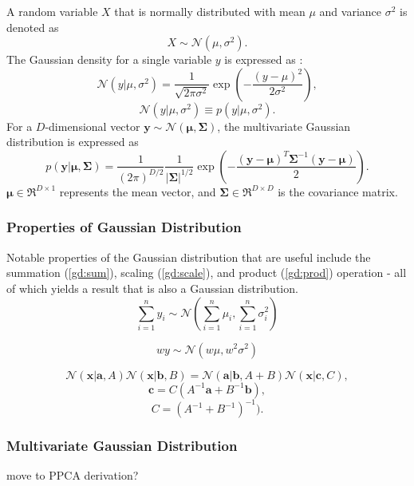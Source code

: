 \documentclass[ %
                    author={Dillon Keith Diep [INCOMPLETE DRAFT, NOT FOR SUBMISSION]},
                supervisor={Dr. Carl Henrik Ek},
                    degree={MEng},
                     title={ARt-CG:},
                  subtitle={Assisted Real-time Content Generation of 3D Hair by Learning Manifolds},
                      type={Research},
                      year={2014} ]{dissertation}
\begin{document}
A random variable $X$ that is normally distributed with mean $\mu$ and variance $\sigma^2$ is denoted as
$$X\sim\mathcal{N}(\mu, \sigma^2).$$
The Gaussian density for a single variable $y$ is expressed as \cite{bishop}:
$$\mathcal{N}(y|\mu, \sigma^2)=\frac{1}{\sqrt{2\pi\sigma^2}}\exp\left(-\frac{(y-\mu)^2}{2\sigma^2}\right),$$
$$\mathcal{N}(y|\mu,\sigma^2) \equiv p(y|\mu,\sigma^2).$$
For a $D$-dimensional vector $\mathbf{y}\sim\mathcal{N}(\pmb{\mu},\pmb{\Sigma})$, the multivariate Gaussian distribution is expressed as \cite{gp}
$$p(\mathbf{y}|\pmb{\mu},\pmb{ \Sigma})=\frac{1}{(2\pi)^{D/2}}\frac{1}{|\pmb{\Sigma}|^{1/2}}\exp\left(-\frac{(\mathbf{y}-\pmb{\mu})^T\pmb{\Sigma}^{-1}(\mathbf{y}-\pmb{\mu})}{2}\right).$$
$\pmb{\mu}\in\Re^{D \times 1}$ represents the mean vector, and $\pmb{\Sigma}\in\Re^{D \times D}$ is the covariance matrix.

\subsubsection{Properties of Gaussian Distribution}
Notable properties of the Gaussian distribution that are useful include the summation (\ref{gd:sum}), scaling (\ref{gd:scale}), and product (\ref{gd:prod}) operation - all of which yields a result that is also a Gaussian distribution. \cite{gp}
\begin{equation} \label{gd:sum}
\sum^n_{i=1}y_i\sim\mathcal{N}(\sum^n_{i=1}\mu_i,\sum^n_{i=1}\sigma^2_i)
\end{equation}

\begin{equation} \label{gd:scale}
wy\sim\mathcal{N}(w\mu,w^2\sigma^2)
\end{equation}

\begin{equation} \label{gd:prod}
\mathcal{N}(\mathbf{x|a},A)\mathcal{N}(\mathbf{x|b},B) = \mathcal{N}(\mathbf{a|b},A+B)\mathcal{N}(\mathbf{x}|\mathbf{c}, C),
\end{equation}
$$\mathbf{c}=C(A^{-1}\mathbf{a}+B^{-1}\mathbf{b}),$$
$$C = (A^{-1}+B^{-1})^{-1}).$$


\subsubsection{Multivariate Gaussian Distribution}
{\color{red} move to PPCA derivation? }
\end{document}
